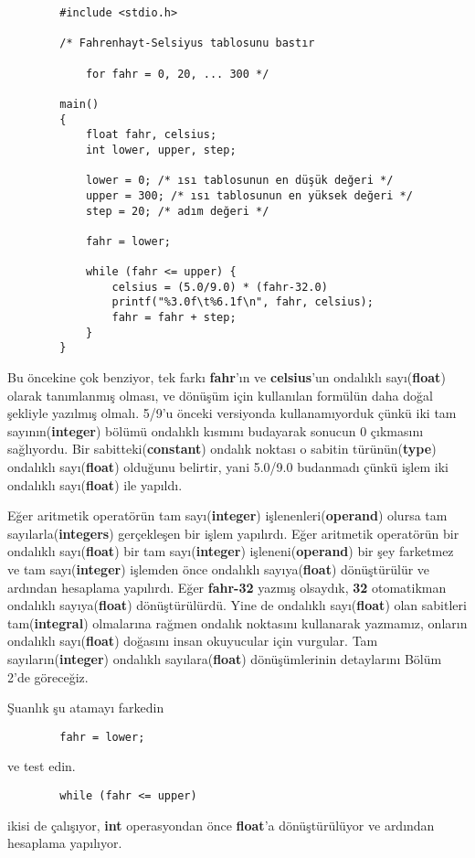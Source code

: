 \documentclass[a4paper,12pt,oneside]{book}
\begin{document}
\begin{lstlisting}
        #include <stdio.h>

        /* Fahrenhayt-Selsiyus tablosunu bastır

            for fahr = 0, 20, ... 300 */

        main()
        {
            float fahr, celsius;
            int lower, upper, step;

            lower = 0; /* ısı tablosunun en düşük değeri */
            upper = 300; /* ısı tablosunun en yüksek değeri */
            step = 20; /* adım değeri */

            fahr = lower;

            while (fahr <= upper) {
                celsius = (5.0/9.0) * (fahr-32.0)
                printf("%3.0f\t%6.1f\n", fahr, celsius);
                fahr = fahr + step;
            }
        }
\end{lstlisting}
\par Bu öncekine çok benziyor, tek farkı \textbf{fahr}'ın ve \textbf{celsius}'un ondalıklı sayı(\textbf{float}) olarak tanımlanmış olması, ve dönüşüm için kullanılan formülün daha doğal şekliyle yazılmış olmalı. 5/9'u önceki versiyonda kullanamıyorduk çünkü iki tam sayının(\textbf{integer}) bölümü ondalıklı kısmını budayarak sonucun 0 çıkmasını sağlıyordu. Bir sabitteki(\textbf{constant}) ondalık noktası o sabitin türünün(\textbf{type}) ondalıklı sayı(\textbf{float}) olduğunu belirtir, yani 5.0/9.0 budanmadı çünkü işlem iki ondalıklı sayı(\textbf{float}) ile yapıldı.
\par Eğer aritmetik operatörün tam sayı(\textbf{integer}) işlenenleri(\textbf{operand}) olursa tam sayılarla(\textbf{integers}) gerçekleşen bir işlem yapılırdı. Eğer aritmetik operatörün bir ondalıklı sayı(\textbf{float}) bir tam sayı(\textbf{integer}) işleneni(\textbf{operand}) bir şey farketmez ve tam sayı(\textbf{integer}) işlemden önce ondalıklı sayıya(\textbf{float}) dönüştürülür ve ardından hesaplama yapılırdı. Eğer \textbf{fahr-32} yazmış olsaydık, \textbf{32} otomatikman ondalıklı sayıya(\textbf{float}) dönüştürülürdü. Yine de ondalıklı sayı(\textbf{float}) olan sabitleri tam(\textbf{integral}) olmalarına rağmen ondalık noktasını kullanarak yazmamız, onların ondalıklı sayı(\textbf{float}) doğasını insan okuyucular için vurgular. Tam sayıların(\textbf{integer}) ondalıklı sayılara(\textbf{float}) dönüşümlerinin detaylarını Bölüm 2'de göreceğiz.


\pagebreak Şuanlık şu atamayı farkedin
\begin{lstlisting}
        fahr = lower;
\end{lstlisting} ve test edin.
\begin{lstlisting}
        while (fahr <= upper)
\end{lstlisting} ikisi de çalışıyor, \textbf{int} operasyondan önce \textbf{float}'a dönüştürülüyor ve ardından hesaplama yapılıyor.
\end{document}
